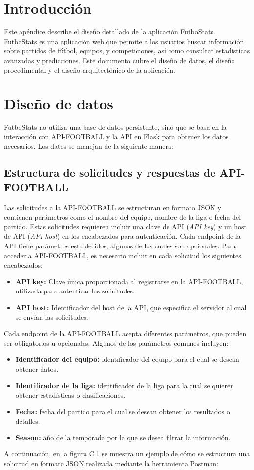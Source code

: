 
\section{Introducción}
Este apéndice describe el diseño detallado de la aplicación FutboStats. FutboStats es una aplicación web que permite a los usuarios buscar información sobre partidos de fútbol, equipos, y competiciones, así como consultar estadísticas avanzadas y predicciones. Este documento cubre el diseño de datos, el diseño procedimental y el diseño arquitectónico de la aplicación.

\section{Diseño de datos}
FutboStats no utiliza una base de datos persistente, sino que se basa en la interacción con API-FOOTBALL y la API en Flask para obtener los datos necesarios. Los datos se manejan de la siguiente manera:
\subsection{Estructura de solicitudes y respuestas de API-FOOTBALL}
Las solicitudes a la API-FOOTBALL se estructuran en formato JSON y contienen parámetros como el nombre del equipo, nombre de la liga o fecha del partido. Estas solicitudes requieren incluir una clave de API (\textit{API key}) y un host de API (\textit{API host}) en los encabezados para autenticación. Cada endpoint de la API tiene parámetros establecidos, algunos de los cuales son opcionales.
Para acceder a API-FOOTBALL, es necesario incluir en cada solicitud los siguientes encabezados:
\begin{itemize}
    \item \textbf{API key:} Clave única proporcionada al registrarse en la API-FOOTBALL, utilizada para autenticar las solicitudes.
    \item \textbf{API host:} Identificador del host de la API, que especifica el servidor al cual se envían las solicitudes.
\end{itemize}
Cada endpoint de la API-FOOTBALL acepta diferentes parámetros, que pueden ser obligatorios u opcionales. Algunos de los parámetros comunes incluyen:
\begin{itemize}
    \item \textbf{Identificador del equipo:} identificador del equipo para el cual se desean obtener datos.
    \item \textbf{Identificador de la liga:} identificador de la liga para la cual se quieren obtener estadísticas o clasificaciones.
    \item \textbf{Fecha:} fecha del partido para el cual se desean obtener los resultados o detalles.
    \item \textbf{Season:} año de la temporada por la que se desea filtrar la información.
\end{itemize}
A continuación, en la figura C.1 se muestra un ejemplo de cómo se estructura una solicitud en formato JSON realizada mediante la herramienta Postman:

